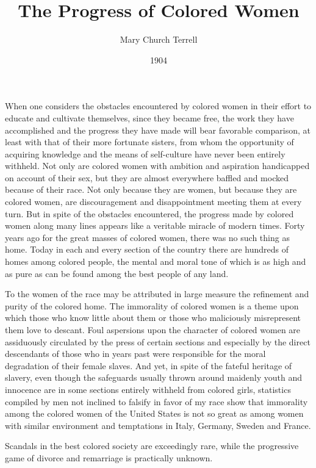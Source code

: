 \documentclass{article}
\title{The Progress of Colored Women}
\author{Mary Church Terrell}
\date{1904}
\begin{document}
\maketitle

When one considers the obstacles encountered by colored women in their effort
to educate and cultivate themselves, since they became free, the work they have
accomplished and the progress they have made will bear favorable comparison, at
least with that of their more fortunate sisters, from whom the opportunity of
acquiring knowledge and the means of self-culture have never been entirely
withheld. Not only are colored women with ambition and aspiration handicapped
on account of their sex, but they are almost everywhere baffled and mocked
because of their race. Not only because they are women, but because they are
colored women, are discouragement and disappointment meeting them at every
turn. But in spite of the obstacles encountered, the progress made by colored
women along many lines appears like a veritable miracle of modern times. Forty
years ago for the great masses of colored women, there was no such thing as
home. Today in each and every section of the country there are hundreds of
homes among colored people, the mental and moral tone of which is as high and
as pure as can be found among the best people of any land.

To the women of the race may be attributed in large measure the refinement and
purity of the colored home. The immorality of colored women is a theme upon
which those who know little about them or those who maliciously misrepresent
them love to descant. Foul aspersions upon the character of colored women are
assiduously circulated by the press of certain sections and especially by the
direct descendants of those who in years past were responsible for the moral
degradation of their female slaves. And yet, in spite of the fateful heritage
of slavery, even though the safeguards usually thrown around maidenly youth and
innocence are in some sections entirely withheld from colored girls, statistics
compiled by men not inclined to falsify in favor of my race show that
immorality among the colored women of the United States is not so great as
among women with similar environment and temptations in Italy, Germany, Sweden
and France.

Scandals in the best colored society are exceedingly rare, while the
progressive game of divorce and remarriage is practically unknown.
\end{document}
